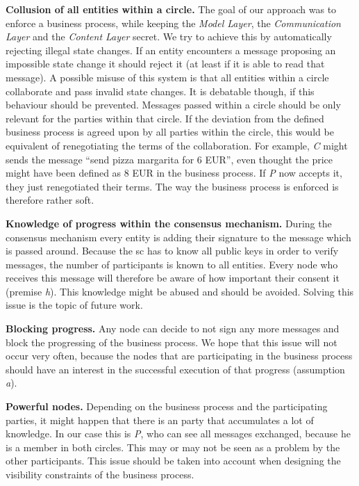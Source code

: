 \documentclass[runningheads]{llncs}
\newcommand{\ber}[1]{\textit{#1}}
\renewcommand{\bigbreak}{}
\newcommand{\quotel}{``}
\newcommand{\quoter}{''}
\begin{document}
\bigbreak
\textbf{Collusion of all entities within a circle.} The goal of our approach was to enforce a business process, while keeping the \ber{Model Layer}, the \ber{Communication Layer} and the \ber{Content Layer} secret. We try to achieve this by automatically rejecting illegal state changes. If an entity encounters a message proposing an impossible state change it should reject it (at least if it is able to read that message). A possible misuse of this system is that all entities within a circle collaborate and pass invalid state changes. It is debatable though, if this behaviour should be prevented. Messages passed within a circle should be only relevant for the parties within that circle. If the deviation from the defined business process is agreed upon by all parties within the circle, this would be equivalent of renegotiating the terms of the collaboration. For example, \ber{C} might sends the message \quotel send pizza margarita for 6 EUR\quoter , even thought the price might have been defined as 8 EUR in the business process. If \ber{P} now accepts it, they just renegotiated their terms. The way the business process is enforced is therefore rather soft. 


\bigbreak
\textbf{Knowledge of progress within the consensus mechanism.} During the consensus mechanism every entity is adding their signature to the message which is passed around. Because the sc has to know all public keys in order to verify messages, the number of participants is known to all entities. Every node who receives this message will therefore be aware of how important their consent it (premise \ber{h}). This knowledge might be abused and should be avoided. Solving this issue is the topic of future work.


\bigbreak
\textbf{Blocking progress.} Any node can decide to not sign any more messages and block the progressing of the business process. We hope that this issue will not occur very often, because the nodes that are participating in the business process should have an interest in the successful execution of that progress (assumption \ber{a}).


\bigbreak
\textbf{Powerful nodes.} Depending on the business process and the participating parties, it might happen that there is an party that accumulates a lot of knowledge. In our case this is \ber{P}, who can see all messages exchanged, because he is a member in both circles. This may or may not be seen as a problem by the other participants. This issue should be taken into account when designing the visibility constraints of the business process. 
\end{document}

